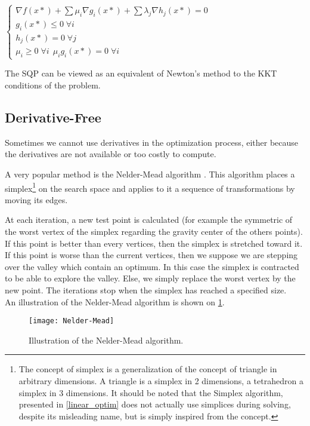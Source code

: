 $\left\{
 		 \begin{array}{l}
			\nabla f(x*) + \displaystyle\sum \mu_i \nabla g_i(x*) + \displaystyle\sum \lambda_j \nabla h_j(x*) = 0 \\
			g_i(x*) \leq 0 \;\forall i \\
			h_j(x*) = 0 \;\forall j \\
			\mu_i \geq 0 \;\forall i\	\
			\mu_ig_i(x*) = 0 \;\forall i
		\end{array}
	\right. $
	
The SQP can be viewed as an equivalent of Newton's method to the KKT conditions of the problem.

\subsection{Derivative-Free}

Sometimes we cannot use derivatives in the optimization process, either because the derivatives are not available or too costly to compute.

A very popular method is the Nelder-Mead algorithm \cite{Nelder01011965}. This algorithm places a simplex\footnote{The concept of simplex is a generalization of the concept of triangle in arbitrary dimensions. A triangle is a simplex in 2 dimensions, a tetrahedron a simplex in 3 dimensions. It should be noted that the Simplex algorithm, presented in \ref{linear_optim} does not actually use simplices during solving, despite its misleading name, but is simply inspired from the concept.} on the search space and applies to it a sequence of transformations by moving its edges.

At each iteration, a new test point is calculated (for example the symmetric of the worst vertex of the simplex regarding the gravity center of the others points). If this point is better than every vertices, then the simplex is stretched toward it. If this point is worse than the current vertices, then we suppose we are stepping over the valley which contain an optimum. In this case the simplex is contracted to be able to explore the valley. Else, we simply replace the worst vertex by the new point. The iterations stop when the simplex has reached a specified size.\\
An illustration of the Nelder-Mead algorithm is shown on \figurename{} \ref{nelder-mead}.

\begin{figure}
\centering
\texttt{[image: Nelder-Mead]}
\caption{Illustration of the Nelder-Mead algorithm.}\label{nelder-mead}
\end{figure}

